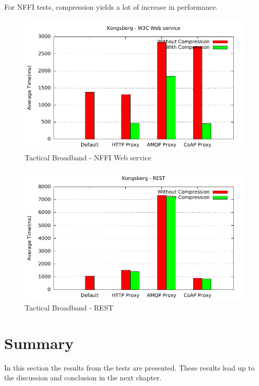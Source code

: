 For NFFI tests, compression yields a lot of increase in performance.

\begin{figure}[H]
\center
\includegraphics[scale=0.75]{../results/kongsberg/nffi/out.pdf}
\caption{Tactical Broadband - NFFI Web service}
\end{figure}

\begin{figure}[H]
\center
\includegraphics[scale=0.75]{../results/kongsberg/rest/out.pdf}
\caption{Tactical Broadband - REST}
\end{figure}



\section{Summary}

In this section the results from the tests are presented. These results lead up
to the discussion and conclusion in the next chapter.

